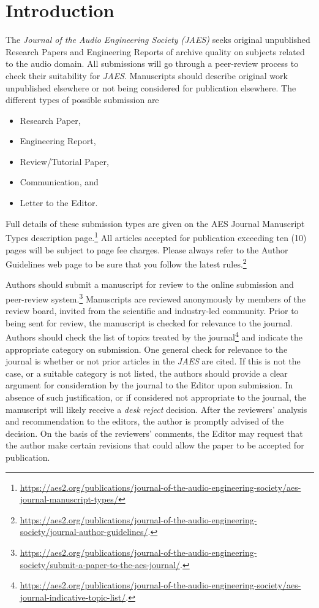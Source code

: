 \documentclass[fleqn]{jaes}
\begin{document}
\section{Introduction}
The \emph{Journal of the Audio Engineering Society (JAES)} seeks original unpublished Research Papers and Engineering Reports of archive quality on subjects related to the audio domain. All submissions will go through a peer-review process to check their suitability for \emph{JAES}. Manuscripts should describe original work unpublished elsewhere or not being considered for publication elsewhere. The different types of possible submission are
\begin{itemize}
    \item Research Paper,
    \item Engineering Report,
    \item Review/Tutorial Paper, 
    \item Communication, and
    \item Letter to the Editor.
\end{itemize}

Full details of these submission types are given on the AES Journal Manuscript Types description page.\footnote{\url{https://aes2.org/publications/journal-of-the-audio-engineering-society/aes-journal-manuscript-types/}} All articles accepted for publication exceeding ten (10) pages will be subject to page fee charges. Please always refer to the  Author Guidelines web page to be sure that you follow the latest rules.\footnote{\url{https://aes2.org/publications/journal-of-the-audio-engineering-society/journal-author-guidelines/}.}

Authors should submit a manuscript for review to the online submission and peer-review system.\footnote{\url{https://aes2.org/publications/journal-of-the-audio-engineering-society/submit-a-paper-to-the-aes-journal/}.} Manuscripts are reviewed anonymously by members of the review board, invited from the scientific and industry-led community. 
Prior to being sent for review, the manuscript is checked for relevance to the journal. Authors should check the list of topics treated by the journal\footnote{\url{https://aes2.org/publications/journal-of-the-audio-engineering-society/aes-journal-indicative-topic-list/}.} and indicate the appropriate category on submission. One general check for relevance to the journal is whether or not prior articles in the \emph{JAES} are cited. If this is not the case, or a suitable category is not listed, the authors should provide a clear argument for consideration by the journal to the Editor upon submission. In absence of such justification, or if considered not appropriate to the journal, the manuscript will likely receive a \emph{desk reject} decision. 
After the reviewers’ analysis and recommendation to the editors, the author is promptly advised of the decision. On the basis of the reviewers’ comments, the Editor may request that the author make certain revisions that could allow the paper to be accepted for publication.
\end{document}
